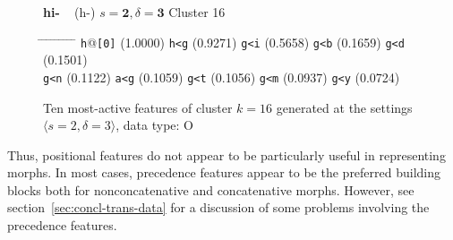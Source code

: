  \begin{figure}[h] 
\begin{mdframed}
{\LARGE \textbf{hi-}} {\large\,\,\, (h-)} \hfill \large{$s=\textbf{2}, \delta=\textbf{3}$} \hfill Cluster 16\\
\vspace{-6pt}
\begin{normalsize}
\begin{tabbing}
\hspace{6ex} \= \hspace{12ex} \= \hspace{6ex} \= \hspace{12ex} \= \hspace{6ex} \= \hspace{12ex} \= \hspace{6ex} \= \hspace{12ex} \= \hspace{6ex} \= \hspace{9ex} \kill
\texttt{h}@\texttt{[0]} \> (1.0000) \> \texttt{h<g} \> (0.9271) \> \texttt{g<i} \> (0.5658) \> \texttt{g<b} \> (0.1659) \> \texttt{g<d} \> (0.1501) \\
\texttt{g<n} \> (0.1122) \> \texttt{a<g} \> (0.1059) \> \texttt{g<t} \> (0.1056) \> \texttt{g<m} \> (0.0937) \> \texttt{g<y} \> (0.0724)
\end{tabbing}
\end{normalsize}
\caption{Ten most-active features of cluster $k = 16$ generated at the settings $\langle s=2,\delta=3 \rangle$, data type: O}
\label{fig:cluster-16-2-3-O}
\end{mdframed}
\end{figure}

Thus, positional features do not appear to be particularly useful in representing morphs. In most cases, precedence features appear to be the preferred building blocks both for nonconcatenative and concatenative morphs. However, see section~\ref{sec:concl-trans-data} for a discussion of some problems involving the precedence features.

